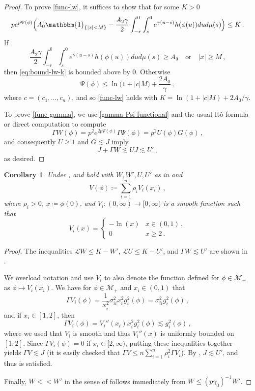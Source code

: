 \documentclass[final]{amsart}
\newtheorem{cor}[thm]{Corollary}
\numberwithin{thm}{section}
\numberwithin{equation}{section}
\newcommand{\Id}{\mathbbm{1}}
\newcommand{\inv}{\mathcal{M}_+}
\newcommand{\Ll}{\mathcal{L}}
\begin{document}
\begin{proof}
To prove \ref{func-lw}, it suffices to show that for some $K > 0$
\begin{equation}\label{eq:bound-lw-k}
    pe^{p\Psi(\phi)}\Big(A_0\Id_{\{|x| < M\}} - \frac{A_2\gamma}{2}\int_{-r}^0\int_s^0 e^{\gamma (u-s)} h(\phi(u))dud\mu(s)\Big) \leq K \,.
\end{equation}  
If 
$$
\frac{A_2\gamma}{2}\int_{-r}^0\int_s^0 e^{\gamma (u-s)} h(\phi(u))dud\mu(s) \geq A_0 \quad \text{or} \quad |x| \geq M \,,
$$ 
then \eqref{eq:bound-lw-k} is bounded above by $0$. Otherwise $$\Psi(\phi) \leq \ln\Big(1 + |c|M\Big) + \frac{2A_0}{\gamma} \,,$$ where $c = (c_1,\dots,c_n)$, and so \ref{func-lw} holds with $K = \ln(1 + |c|M) + 2A_0/\gamma$.

To prove \ref{func-gamma}, we use \eqref{gamma-Psi-functional} and the usual It\^{o} formula or direct computation to compute
$$\Gamma W(\phi) = p^2e^{2p\Psi(\phi)} \Gamma \Psi(\phi) = p^2U(\phi)G(\phi) \,,$$ 
and consequently $U \geq 1$ and $G \lesssim J$ imply $$J + \Gamma W \lesssim UJ \lesssim U' \,,$$
as desired.
\end{proof}



\begin{cor}\label{fass1-and-fass2-are-satisfied}
Under ,  and  hold with $W, W', U, U'$ as in  and \begin{equation}\label{func-V}
    V(\phi) \coloneqq \sum_{i=1}^n \rho_i V_i(x_i) \,,
\end{equation}
where $\rho_i > 0$, $x \coloneqq \phi(0)$, and $V_i: (0,\infty) \to [0,\infty)$ is a smooth function such that 
\begin{equation}
    V_i(x) = \begin{cases}
        -\ln(x) & x \in (0, 1)\,, \\
        0 & x \geq 2 \,.
    \end{cases}
\end{equation}
\end{cor}

\begin{proof}
    The inequalities $\Ll W \leq K - W'$, $\Ll U \leq K - U'$, and $\Gamma W \lesssim U'$ are shown in .
    
    We overload notation and use $V_i$ to also denote the function defined for $\phi \in \inv$ as $\phi \mapsto V_i(x_i)$. We have for $\phi \in \inv$ and $x_i \in (0,1)$ that $$\Gamma V_i(\phi) = \frac{1}{x_i^2}\sigma_{ii}^2x_i^2g_i^2(\phi) = \sigma_{ii}^2g_i^2(\phi) \,,$$ and if $x_i \in [1,2]$, then 
    $$\Gamma V_i(\phi) = V_i''(x_i)x_i^2g_i^2(\phi) \lesssim g_i^2(\phi) \,,$$ 
    where we used that $V_i$ is smooth and thus $V_i''(x)$ is uniformly bounded on $[1,2]$. Since $\Gamma V_i(\phi) = 0$ if $x_i \in [2,\infty)$, putting these inequalities together yields $\Gamma V \lesssim J$ (it is easily checked that $\Gamma V \leq n\sum_{i=1}^n \rho_i^2 \Gamma V_i$). By , 
    $J \lesssim U'$, and thus  is satisfied.

    Finally, $W << W'$ in the sense of \Cref{<<} follows immediately from $W \leq (p\gamma_0)^{-1}W'$.
\end{proof}
\end{document}
